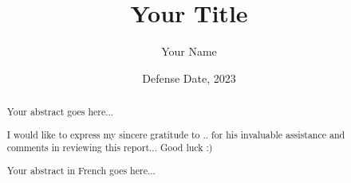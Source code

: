 \documentclass[12pt, a4paper]{memoir} %
\title{Your Title} %
\author{Your Name}
\date{Defense Date, 2023} %
\begin{document}
\frontmatter
\begin{titlingpage}
    \maketitle
\end{titlingpage}

\setlength{\parskip}{-1pt plus 1pt}

\renewcommand{\abstracttextfont}{\normalfont}
\abstractintoc
\begin{abstract}
    Your abstract goes here...
\end{abstract}
\abstractintoc

\renewcommand\abstractname{Acknowledgement}
\begin{abstract}
    I would like to express my sincere gratitude to .. for his invaluable assistance and comments in reviewing this report...
    Good luck :)
\end{abstract}


\renewcommand\abstractname{R\'esum\'e}
\begin{abstract} 
    Your abstract in French goes here...
\end{abstract}


\newtheorem{theorem}{Theorem}[section]
\newtheorem{definition}[theorem]{Definition}
\newtheorem{proposition}[theorem]{Proposition}
\newtheorem{lemma}[theorem]{Lemma}

\newcommand{\R}{\mathbb{R}}
\newcommand{\C}{\mathbb{C}}
\newcommand{\E}{\mathbb{E}}
\newcommand{\innerprod}[2]{\langle #1, #2 \rangle}
\newcommand{\Epsilon}{\mathcal{E}}
\newcommand{\Q}{\mathbb{Q}}




\cleardoublepage

\tableofcontents* %
\normalsize

\mainmatter
\SingleSpace







\backmatter



\end{document}
